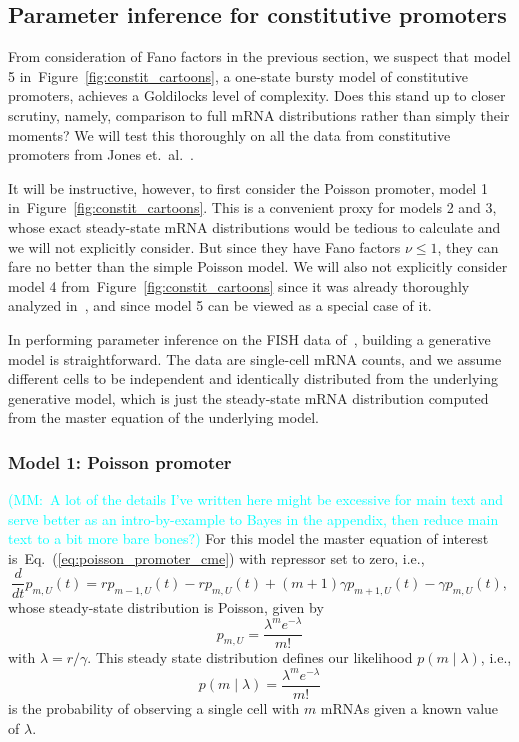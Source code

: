 \documentclass[12pt]{article}%
\newcommand{\mmnote}[1]{\textcolor{cyan}{(MM:~#1)}}
\newcommand{\deriv}[2][{}]{\frac{d #1}{d #2}}
\newcommand{\fig}[1]{Figure~\ref{#1}}
\newcommand{\eq}[1]{Eq.~(\ref{#1})}
\begin{document}
\subsection{Parameter inference for constitutive promoters}

From consideration of Fano factors in the previous section, we
suspect that model 5 in~\fig{fig:constit_cartoons},
a one-state bursty model of constitutive promoters,
achieves a Goldilocks level of complexity.
Does this stand up to closer scrutiny, namely, comparison to
full mRNA distributions rather than simply their moments?
We will test this thoroughly on all the data
from constitutive promoters from Jones et.\ al.~\cite{Jones2014}.

It will be instructive, however, to first consider the
Poisson promoter, model 1 in~\fig{fig:constit_cartoons}.
This is a convenient proxy for models 2 and 3, whose exact
steady-state mRNA distributions would be tedious to calculate
and we will not explicitly consider.
But since they have Fano factors $\nu\le 1$, they can
fare no better than the simple Poisson model.
We will also not explicitly consider model 4 from~\fig{fig:constit_cartoons}
since it was already thoroughly analyzed in~\cite{Razo-Mejia2020},
and since model 5 can be viewed as a special case of it.

In performing parameter inference on the FISH data
of~\cite{Jones2014}, building a generative model is
straightforward. The data are single-cell mRNA counts, and we
assume different cells to be independent and identically
distributed from the underlying generative model, which is just
the steady-state mRNA distribution computed from the master
equation of the underlying model.

\subsubsection{Model 1: Poisson promoter}
\mmnote{A lot of the details I've written here might be excessive for main text and serve better as an intro-by-example to Bayes in the appendix, then reduce main text to a bit more bare bones?}
For this model the master equation of interest
is~\eq{eq:poisson_promoter_cme} with repressor set to zero, i.e.,
\begin{equation}
\deriv{t}p_{m,U}(t) = rp_{m-1,U}(t) - rp_{m,U}(t)
        + (m+1)\gamma p_{m+1,U}(t) - \gamma p_{m,U}(t),
\end{equation}
whose steady-state distribution is Poisson, given by
\begin{equation}
p_{m,U} = \frac{\lambda^m e^{-\lambda}}{m!}
\end{equation}
with $\lambda=r/\gamma$. This steady state distribution defines our
likelihood $p(m\mid\lambda)$, i.e.,
\begin{equation}
p(m\mid\lambda) = \frac{\lambda^m e^{-\lambda}}{m!}
\label{eq:poisson_inference010}
\end{equation}
is the probability of observing
a single cell with $m$ mRNAs given a known value of $\lambda$.
\end{document}
